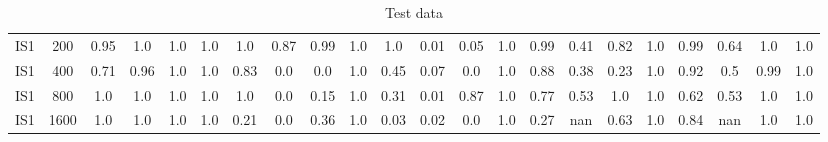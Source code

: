 \documentclass[10pt]{article}
\begin{document}
\begin{table}
\begin{tabular}{ cc||c c c c | c c c c | c c c c | c c c c| c c c c}
 					IS1 & 200 & 0.95 & 1.0 & 1.0 & 1.0 & 1.0 & 0.87 & 0.99 & 1.0& 1.0 & 0.01 & 0.05 & 1.0& 0.99 & 0.41 & 0.82 & 1.0 & 0.99 & 0.64 & 1.0 & 1.0\\ 
 					IS1 & 400 & 0.71 & 0.96 & 1.0 & 1.0 & 0.83 & 0.0 & 0.0 & 1.0& 0.45 & 0.07 & 0.0 & 1.0& 0.88 & 0.38 & 0.23 & 1.0 & 0.92 & 0.5 & 0.99 & 1.0\\ 
 					IS1 & 800 & 1.0 & 1.0 & 1.0 & 1.0 & 1.0 & 0.0 & 0.15 & 1.0& 0.31 & 0.01 & 0.87 & 1.0& 0.77 & 0.53 & 1.0 & 1.0 & 0.62 & 0.53 & 1.0 & 1.0\\ 
 					IS1 & 1600 & 1.0 & 1.0 & 1.0 & 1.0 & 0.21 & 0.0 & 0.36 & 1.0& 0.03 & 0.02 & 0.0 & 1.0& 0.27 & nan & 0.63 & 1.0 & 0.84 & nan & 1.0 & 1.0\\ \hline
 \hline
  \end{tabular}
  \caption{Test data}
\end{table}


\newpage
\end{document}

